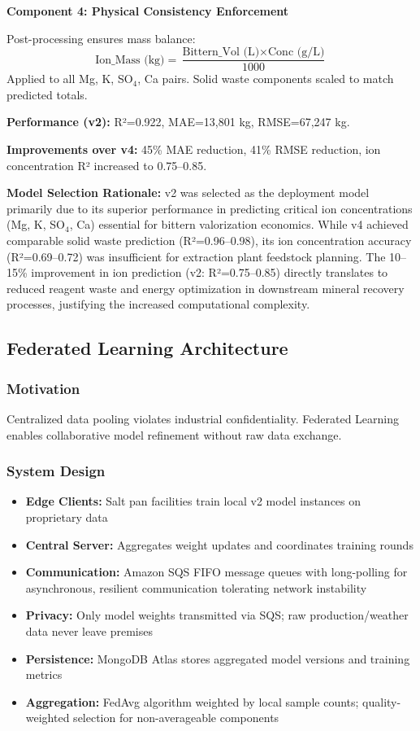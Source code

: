 \documentclass[conference]{IEEEtran}
\begin{document}
\textbf{Component 4: Physical Consistency Enforcement}

Post-processing ensures mass balance:
\begin{equation}
\text{Ion\_Mass (kg)} = \frac{\text{Bittern\_Vol (L)} \times \text{Conc (g/L)}}{1000}
\end{equation}
Applied to all Mg, K, SO$_4$, Ca pairs. Solid waste components scaled to match predicted totals.

\textbf{Performance (v2):} R²=0.922, MAE=13,801 kg, RMSE=67,247 kg.

\textbf{Improvements over v4:} 45\% MAE reduction, 41\% RMSE reduction, ion concentration R² increased to 0.75–0.85.

\textbf{Model Selection Rationale:} v2 was selected as the deployment model primarily due to its superior performance in predicting critical ion concentrations (Mg, K, SO$_4$, Ca) essential for bittern valorization economics. While v4 achieved comparable solid waste prediction (R²=0.96–0.98), its ion concentration accuracy (R²=0.69–0.72) was insufficient for extraction plant feedstock planning. The 10–15\% improvement in ion prediction (v2: R²=0.75–0.85) directly translates to reduced reagent waste and energy optimization in downstream mineral recovery processes, justifying the increased computational complexity.

\subsection{Federated Learning Architecture}

\subsubsection{Motivation}
Centralized data pooling violates industrial confidentiality. Federated Learning enables collaborative model refinement without raw data exchange.

\subsubsection{System Design}
\begin{itemize}
    \item \textbf{Edge Clients:} Salt pan facilities train local v2 model instances on proprietary data
    \item \textbf{Central Server:} Aggregates weight updates and coordinates training rounds
    \item \textbf{Communication:} Amazon SQS FIFO message queues with long-polling for asynchronous, resilient communication tolerating network instability
    \item \textbf{Privacy:} Only model weights transmitted via SQS; raw production/weather data never leave premises
    \item \textbf{Persistence:} MongoDB Atlas stores aggregated model versions and training metrics
    \item \textbf{Aggregation:} FedAvg algorithm \cite{mcmahan2017federated} weighted by local sample counts; quality-weighted selection for non-averageable components
\end{itemize}
\end{document}
